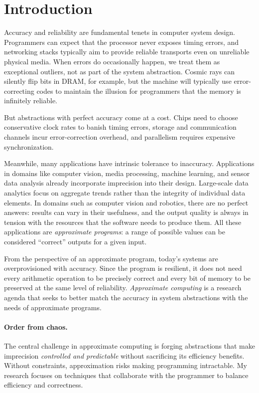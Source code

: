 \section{Introduction}
\label{sec:intro}

Accuracy and reliability are fundamental tenets in computer system design.
Programmers can expect that the processor never exposes timing
errors, and networking stacks typically aim to provide reliable transports
even on unreliable physical media.
When errors do occasionally happen, we treat them as exceptional outliers, not
as part of the system abstraction.
Cosmic rays can silently flip bits in DRAM, for example,
but the machine will typically use error-correcting codes to
maintain the illusion for programmers that the memory is infinitely reliable.

But abstractions with perfect accuracy come at a cost.
Chips need to choose conservative clock rates to banish timing errors,
storage and communication channels incur error-correction overhead,
and parallelism requires expensive synchronization.

Meanwhile, many applications have intrinsic tolerance to inaccuracy.
Applications in domains like computer vision, media
processing, machine learning, and sensor data analysis already incorporate
imprecision into their design.
Large-scale data analytics focus on aggregate trends rather than the integrity
of individual data elements.
In domains such as computer vision and robotics, there are no perfect answers:
results can vary in their usefulness, and the output quality is always in
tension with the resources that the software needs to produce them.
All these applications are \emph{approximate
programs}: a range of possible values can be considered ``correct'' outputs
for a given input.

From the perspective of an approximate program, today's
systems are overprovisioned with accuracy. Since the program is resilient, it
does
not need every arithmetic operation to be precisely correct and every bit of
memory to be preserved at the same level of reliability.
\emph{Approximate computing} is a research agenda that seeks to better match
the accuracy in system abstractions with the needs of approximate
programs.

\paragraph{Order from chaos.}
The central challenge in approximate computing is forging abstractions that
make imprecision \emph{controlled and predictable} without sacrificing its
efficiency benefits.
Without constraints, approximation risks making programming intractable.
My
research focuses on techniques that collaborate with the programmer to balance
efficiency and correctness.

